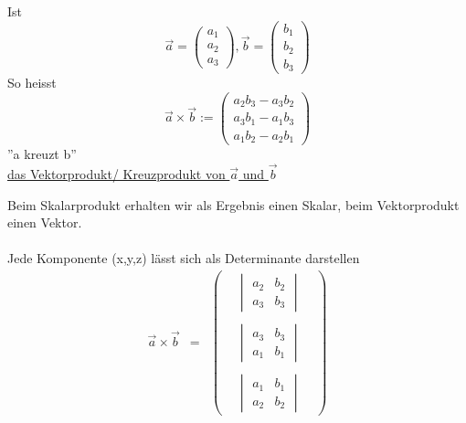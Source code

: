 \begin{mydef}
	Ist
	\begin{equation*} \vec{a} = \begin{pmatrix}a_1 \\ a_2 \\ a_3\end{pmatrix},  \vec{b} = 					\begin{pmatrix}b_1 \\ b_2 \\ b_3\end{pmatrix} \end{equation*}
	So heisst
	\begin{equation*} \vec{a} \times \vec{b} := \begin{pmatrix}a_2b_3 -a_3b_2 \\ a_3b_1 - a_1b_3 \\ a_1b_2 - a_2b_1\end{pmatrix} \end{equation*}
	''a kreuzt b''\\
	\underline{das Vektorprodukt/ Kreuzprodukt von $\vec{a}$ und $\vec{b}$}
\end{mydef}
\noindent 
Beim Skalarprodukt erhalten wir als Ergebnis einen Skalar, beim Vektorprodukt einen Vektor. \\
\\
Jede Komponente (x,y,z) lässt sich als Determinante darstellen
\begin{eqnarray*}
	\vec{a} \times \vec{b} &=& 
	\begin{pmatrix}
		&
		\begin{vmatrix}
			a_2 & b_2\\
			a_3 & b_3
		\end{vmatrix}
		&
		\\
		\\
		&
		\begin{vmatrix}
			a_3 & b_3\\
			a_1 & b_1
		\end{vmatrix}
		&
		\\
		\\
		&
		\begin{vmatrix}
			a_1 & b_1\\
			a_2 & b_2
		\end{vmatrix}
		&
	\end{pmatrix} 
\end{eqnarray*}

